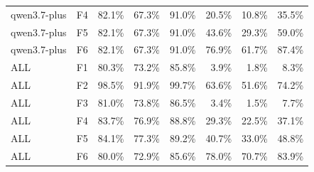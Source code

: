 \begin{tabular}{llrrrrrr}
qwen3.7-plus & F4 & 82.1\% & 67.3\% & 91.0\% & 20.5\% & 10.8\% & 35.5\% \\
qwen3.7-plus & F5 & 82.1\% & 67.3\% & 91.0\% & 43.6\% & 29.3\% & 59.0\% \\
qwen3.7-plus & F6 & 82.1\% & 67.3\% & 91.0\% & 76.9\% & 61.7\% & 87.4\% \\
ALL & F1 & 80.3\% & 73.2\% & 85.8\% & 3.9\% & 1.8\% & 8.3\% \\
ALL & F2 & 98.5\% & 91.9\% & 99.7\% & 63.6\% & 51.6\% & 74.2\% \\
ALL & F3 & 81.0\% & 73.8\% & 86.5\% & 3.4\% & 1.5\% & 7.7\% \\
ALL & F4 & 83.7\% & 76.9\% & 88.8\% & 29.3\% & 22.5\% & 37.1\% \\
ALL & F5 & 84.1\% & 77.3\% & 89.2\% & 40.7\% & 33.0\% & 48.8\% \\
ALL & F6 & 80.0\% & 72.9\% & 85.6\% & 78.0\% & 70.7\% & 83.9\% \\
\bottomrule
\end{tabular}

